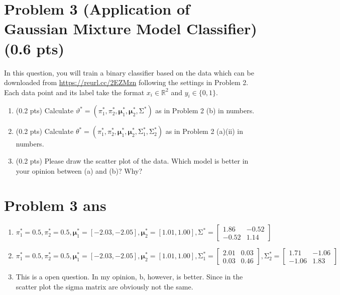 \documentclass{article}
\newcommand{\real}{\mathbb{R}}
\def\vecmu{{\boldsymbol \mu}}
\def\matSigma{{\mathbf{\mathrm{\Sigma}}}}
\def\real{{\mathbb {R}}}
\begin{document}
\section*{Problem 3 (Application of Gaussian Mixture Model Classifier) (0.6 pts)}
In this question, you will train a binary classifier based on the data which can be downloaded from \href{https://reurl.cc/2EZMzn}{https://reurl.cc/2EZMzn}  following the settings in Problem 2. Each data point and its label take the format $x_i \in \real^2$ and $y_i \in \{0,1\}$. 
\begin{enumerate}[label=(\alph*)]
    \item (0.2 pts) Calculate $\vartheta^* = (\pi^*_1,\pi^*_2,\vecmu^*_1,\vecmu^*_2,\matSigma^*)$ as in Problem 2 (b) in numbers.
    \item (0.2 pts) Calculate $\theta^* = (\pi^*_1,\pi^*_2,\vecmu^*_1,\vecmu^*_2,\matSigma^*_1,\matSigma^*_2)$ as in Problem 2 (a)(ii) in numbers.
    \item (0.2 pts) Please draw the scatter plot of the data. Which model is better in your opinion between (a) and (b)? Why?
\end{enumerate}

\section*{Problem 3 ans}
\begin{enumerate}[label=(\alph*)]
    \item 
    \[
    \pi^*_1=0.5,\pi^*_2=0.5,\vecmu^*_1=[-2.03,-2.05],\vecmu^*_2=[1.01,1.00],\matSigma^*=
    \left[
    \begin{array}{cc}
        1.86 & -0.52 \\
        -0.52 & 1.14
    \end{array}
    \right]
    \]
    \item
    \[
    \pi^*_1=0.5,\pi^*_2=0.5,\vecmu^*_1=[-2.03,-2.05],\vecmu^*_2=[1.01,1.00],\matSigma^*_1=
    \left[
    \begin{array}{cc}
        2.01 & 0.03 \\
        0.03 & 0.46
    \end{array}
    \right],
    \matSigma^*_2 =
    \left[
    \begin{array}{cc}
        1.71 & -1.06 \\
        -1.06 & 1.83
    \end{array}
    \right]
    \]
    \item This is a open question. In my opinion, b, however, is better. Since in the scatter plot the sigma matrix are obviously not the same.
\end{enumerate}
 
\end{document}
